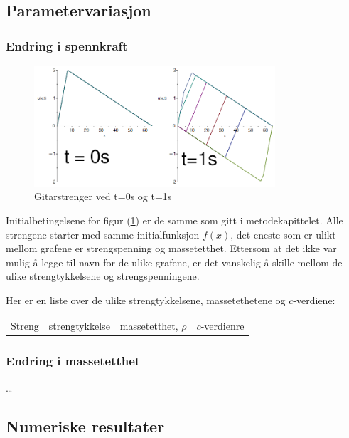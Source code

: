 \subsection{Parametervariasjon}
\subsubsection{Endring i spennkraft}

\begin{figure}[H]
	\centering
	\includegraphics[width=0.8\textwidth]{figurer/MapleSimulering0sog1s.png}
	\caption{Gitarstrenger ved t=0s og t=1s}
	\label{fig:mapleSim0sog1s}
\end{figure}

Initialbetingelsene for figur (\ref{fig:mapleSim0sog1s}) er de samme som gitt i metodekapittelet. Alle 
strengene starter med samme initialfunksjon $f(x)$, det eneste som er ulikt mellom grafene er strengspenning
og massetetthet. Ettersom at det ikke var mulig å legge til navn for de ulike grafene, er det vanskelig å
skille mellom de ulike strengtykkelsene og strengspenningene. 

Her er en liste over de ulike strengtykkelsene, massetethetene og $c$-verdiene:

\begin{center}
	\begin{tabular}{|c|c|c|c|}
		 Streng	&	strengtykkelse	&	massetetthet, $\rho$	& $c$-verdienre \\  
	\end{tabular}
\end{center}

\subsubsection{Endring i massetetthet}
\dots

\subsection{Numeriske resultater}
